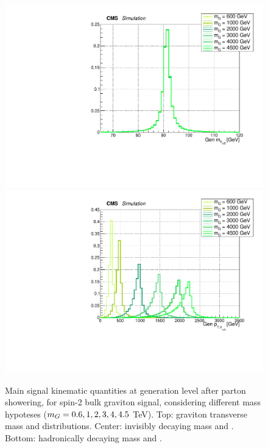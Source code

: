 \begin{figure}[!htb]
\begin{center}
     \includegraphics[width=.495\textwidth]{Gen_v9/XZZInv_g_VHadMass.pdf}%
     \includegraphics[width=.495\textwidth]{Gen_v9/XZZInv_g_VHadPt.pdf}%
   \end{center}
   \caption{Main signal kinematic quantities at generation level after parton showering, for spin-2 bulk graviton signal, considering different mass hypoteses ($m_{G} = 0.6, 1, 2, 3, 4, 4.5$ TeV). Top: graviton transverse mass and \pt distributions. Center: invisibly decaying \Z mass and \pt. Bottom: hadronically decaying \Z mass and \pt.}
   \label{fig:genGravSignal1}
 \end{figure}

